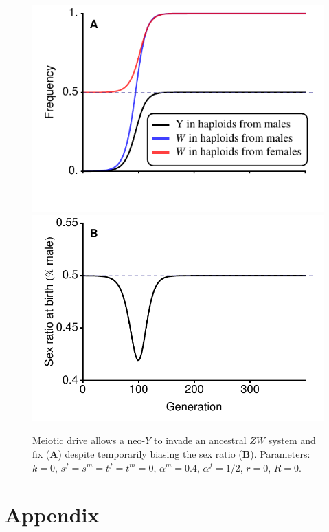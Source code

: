 \documentclass[12pt]{article}
\begin{document}
\begin{figure}
\centering
\includegraphics[width=0.5\linewidth]{FreqWCounterKozi}\\
\includegraphics[width=0.5\linewidth]{SexRatioCounterKozi}\\
\caption{
Meiotic drive allows a neo-$Y$ to invade an ancestral $ZW$ system and fix (\textbf{A}) despite temporarily biasing the sex ratio (\textbf{B}). %
Parameters: $k=0$, $s^f = s^m = t^f = t^m = 0$, $\alpha^m = 0.4$, $\alpha^f = 1/2$, $r=0$, $R=0$.
}
\label{fig:CounterKozi}
\end{figure}














\setcounter{equation}{0}
\renewcommand{\theequation}{S.\arabic{equation}}
\setcounter{figure}{0}
\renewcommand{\thefigure}{S.\arabic{figure}}
\setcounter{table}{0}
\renewcommand{\thetable}{S.\arabic{table}}

\newpage

\section*{Appendix}
\end{document}
